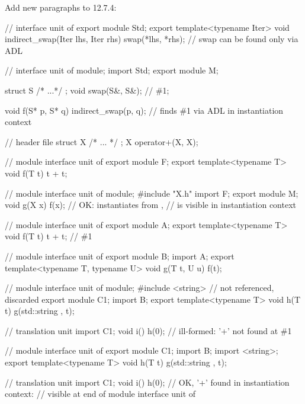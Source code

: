 \noindent
Add new paragraphs to 12.7.4:
\begin{std.txt}
\color{addclr}
\alinea
\enterexample
\begin{codeblock}
// interface unit of 
export module Std;
export template<typename Iter>
void indirect_swap(Iter lhs, Iter rhs)
{
  swap(*lhs, *rhs);     // swap can be found only via ADL
}

// interface unit of 
module;
import Std;
export module M;

struct S { /* ...*/ };
void swap(S&, S&);      // \#1;

void f(S* p, S* q)
{
  indirect_swap(p, q);  // finds \#1 via ADL in instantiation context
}
\end{codeblock}
\exitexample

\alinea
\enterexample
\begin{codeblock}
// header file 
struct X { /* ... */ };
X operator+(X, X);

// module interface unit of 
export module F;
export template<typename T>
void f(T t) {
  t + t;
}

// module interface unit of 
module;
#include "X.h"
import F;
export module M;
void g(X x) {
  f(x);             // OK: instantiates  from ,
                    //  is visible in instantiation context
}
\end{codeblock}
\exitexample

\alinea
\enterexample
\begin{codeblock}
// module interface unit of 
export module A;
export template<typename T>
void f(T t) {
  t + t;           // \#1
}

// module interface unit of 
export module B;
import A;
export template<typename T, typename U>
void g(T t, U u) {
  f(t);
}

// module interface unit of 
module;
#include <string>   //  not referenced, discarded
export module C1;
import B;
export template<typename T>
void h(T t) {
  g(std::string{ }, t);
}

// translation unit
import C1;
void i() {
   h(0);        // ill-formed: '+' not found at \#1
}

// module interface unit of 
export module C1;
import B;
import <string>;
export template<typename T>
void h(T t) {
  g(std::string{ }, t);
}

// translation unit
import C1;
void i() {
   h(0);        // OK, '+' found in instantiation context:
                // visible at end of module interface unit of 
}
\end{codeblock}
\exitexample
\end{std.txt}

